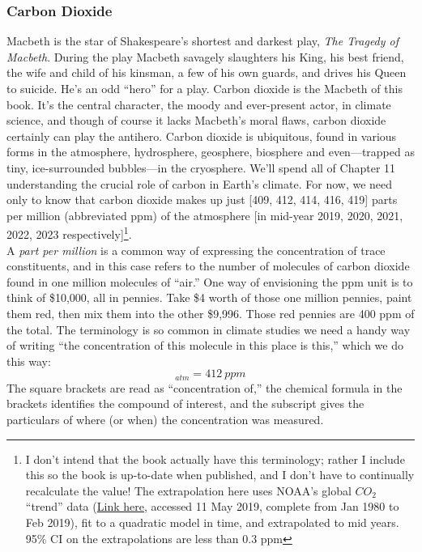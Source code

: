 \subsubsection{Carbon Dioxide}
Macbeth is the star of Shakespeare's shortest and darkest play, \textit{The Tragedy of Macbeth}. During the play Macbeth savagely slaughters his King, his best friend, the wife and child of his kinsman, a few of his own guards, and drives his Queen to suicide. He's an odd ``hero'' for a play. Carbon dioxide is the Macbeth of this book. It's the central character, the moody and ever-present actor, in climate science, and though of course it lacks Macbeth's moral flaws, carbon dioxide certainly can play the antihero. Carbon dioxide is ubiquitous, found in various forms in the atmosphere, hydrosphere, geosphere, biosphere and even---trapped as tiny, ice-surrounded bubbles---in the cryosphere. We'll spend all of Chapter 11 understanding the crucial role of carbon in Earth's climate. For now, we need only to know that carbon dioxide makes up just [409, 412, 414, 416, 419] parts per million (abbreviated ppm) of the atmosphere [in mid-year 2019, 2020, 2021, 2022, 2023 respectively]\footnote{I don't intend that the book actually have this terminology; rather I include this so the book is up-to-date when published, and I don't have to continually recalculate the value! The extrapolation here uses NOAA's global $CO_2$ ``trend'' data (\href{ftp://aftp.cmdl.noaa.gov/products/trends/co2/co2_mm_gl.txt}{Link here}, accessed 11 May 2019, complete from Jan 1980 to Feb 2019), fit to a quadratic model in time, and extrapolated to mid years. 95\% CI on the extrapolations are less than 0.3 ppm}.\\
A \emph{part per million} is a common way of expressing the concentration of trace constituents, and in this case refers to the number of molecules of carbon dioxide found in one million molecules of ``air.'' One way of envisioning the ppm unit is to think of \$10,000, all in pennies. Take \$4 worth of those one million pennies, paint them red, then mix them into the other \$9,996. Those red pennies are 400 ppm of the total. The terminology is so common in climate studies we need a handy way of writing ``the concentration of this molecule in this place is this,'' which we do this way:
\begin{equation}
	[CO_2]_{atm}=412\ ppm
\end{equation}
The square brackets are read as ``concentration of,'' the chemical formula in the brackets identifies the compound of interest, and the subscript gives the particulars of where (or when) the concentration was measured.


